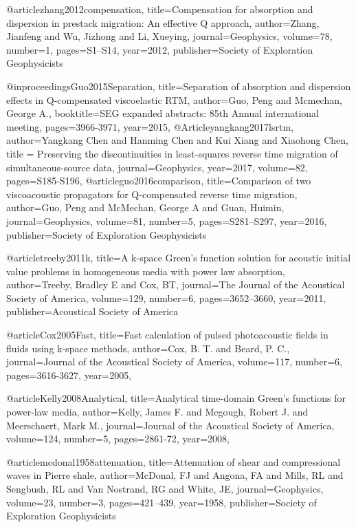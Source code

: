 {@article{zhang2012compensation,
  title={Compensation for absorption and dispersion in prestack migration: {A}n effective {Q} approach},
  author={Zhang, Jianfeng and Wu, Jizhong and Li, Xueying},
  journal={Geophysics},
  volume={78},
  number={1},
  pages={S1--S14},
  year={2012},
  publisher={Society of Exploration Geophysicists}
}

@inproceedings{Guo2015Separation,
  title={Separation of absorption and dispersion effects in {Q}-compensated viscoelastic {RTM}},
  author={Guo, Peng and Mcmechan, George A.},
  booktitle={SEG expanded abstracts: 85th Annual international meeting},
  pages={3966-3971},
  year={2015},
}
@Article{yangkang2017lsrtm,
  author={Yangkang Chen and Hanming Chen and Kui Xiang and Xiaohong Chen},
  title = {Preserving the discontinuities in least-squares reverse time migration of simultaneous-source data},
  journal={Geophysics},
  year=2017,
  volume=82,
  pages={S185-S196},
}
@article{guo2016comparison,
  title={Comparison of two viscoacoustic propagators for {Q}-compensated reverse time migration},
  author={Guo, Peng and McMechan, George A and Guan, Huimin},
  journal={Geophysics},
  volume={81},
  number={5},
  pages={S281--S297},
  year={2016},
  publisher={Society of Exploration Geophysicists}
}


@article{treeby2011k,
  title={A k-space Green's function solution for acoustic initial value problems in homogeneous media with power law absorption},
  author={Treeby, Bradley E and Cox, BT},
  journal={The Journal of the Acoustical Society of America},
  volume={129},
  number={6},
  pages={3652--3660},
  year={2011},
  publisher={Acoustical Society of America}
}

@article{Cox2005Fast,
  title={Fast calculation of pulsed photoacoustic fields in fluids using k-space methods},
  author={Cox, B. T. and Beard, P. C.},
  journal={Journal of the Acoustical Society of America},
  volume={117},
  number={6},
  pages={3616-3627},
  year={2005},
}

@article{Kelly2008Analytical,
  title={Analytical time-domain Green's functions for power-law media},
  author={Kelly, James F. and Mcgough, Robert J. and Meerschaert, Mark M.},
  journal={Journal of the Acoustical Society of America},
  volume={124},
  number={5},
  pages={2861-72},
  year={2008},
}

@article{mcdonal1958attenuation,
  title={Attenuation of shear and compressional waves in Pierre shale},
  author={McDonal, FJ and Angona, FA and Mills, RL and Sengbush, RL and Van Nostrand, RG and White, JE},
  journal={Geophysics},
  volume={23},
  number={3},
  pages={421--439},
  year={1958},
  publisher={Society of Exploration Geophysicists}
}

}
